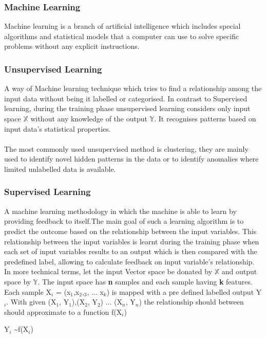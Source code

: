 \documentclass{article}
\begin{document}
\subsubsection{Machine Learning}Machine learning is a branch of artificial intelligence which includes special algorithms and statistical models that a computer can use to solve specific problems without any explicit instructions.
\\

\subsubsection{Unsupervised Learning}A way of Machine learning technique which tries to find a relationship among the input data without being it labelled or categorised. In contrast to Supervised learning, during the training phase unsupervised learning considers only input space \(\mathbb{X}\) without any knowledge of the output \(\mathbb{Y}\). It recognises patterns based on input data's statistical properties.\\\\
The most commonly used unsupervised method is clustering, they are mainly used to identify novel hidden patterns in the data or to identify anomalies where limited unlabelled data is available.

\subsubsection {Supervised Learning} A machine learning methodology in which the machine is able to learn by providing feedback to itself.The main goal of such a learning algorithm is to predict the outcome based on the relationship between the input variables. This relationship between the input variables is learnt during the training phase when each set of input variables results to an output which is then compared with the predefined label, allowing to calculate feedback on input variable's relationship.\newline\\
In more technical terms, let the input Vector space be donated by \(\mathbb{X}\) and output space by \(\mathbb{Y}\). The input space has \textbf{n} samples and each sample having \textbf{k} features. Each sample X$_{i}$ = (x$_{1}$,x$_{2}$,$_{3}$, ... x$_{k}$) is mapped with a pre defined labelled output Y$_{i}$. 
With given (X$_{1}$, Y$_{1}$),(X$_{2}$, Y$_{2}$) ... (X$_{n}$, Y$_{n}$) the relationship should between should approximate to a function f(X$_{i}$)\newline\\
\centerline{Y$_{i}$ \sim f(X$_{i}$)}\newline
\end{document}
